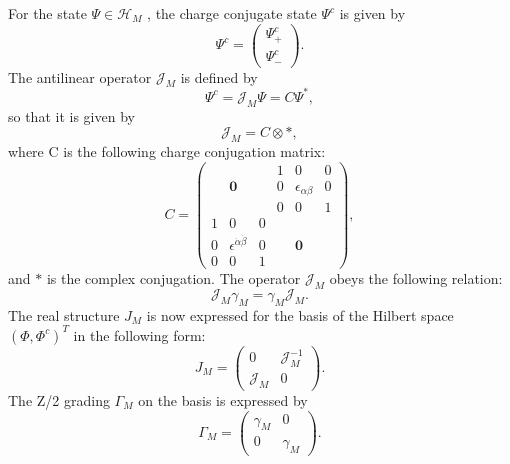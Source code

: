 \documentclass{ptephy}%
\begin{document}
For the state $\Psi \in \mathcal{H}_M$ , the charge conjugate state $\Psi^c$ is given by
\begin{equation}
\Psi^c = \begin{pmatrix}
\Psi_+^c\\
\Psi_-^c
\end{pmatrix}.
\end{equation}
The antilinear operator $\mathcal{J}_M$ is defined by
\begin{equation}
\Psi^c = \mathcal{J}_M\Psi =C\Psi^*,
\end{equation}
so that it is given by
\begin{equation}
\mathcal{J}_M = C\otimes *,
\end{equation}
where C is the following charge conjugation matrix:
\begin{equation}
C =\left(\begin{array}{ccc|ccc}
 & & & 1 & 0 & 0  \\
 & \mathbf{0} & & 0 & \epsilon_{\alpha\beta} & 0 \\
   & & & 0 & 0 & 1  \\
  \hline 
  1 & 0 & 0 & & &  \\
  0 & \epsilon^{\dot{\alpha}\dot{\beta}} & 0 & & \mathbf{0} & \\
  0 & 0 & 1 & & &
\end{array}\right),
\end{equation}
and $*$ is the complex conjugation. The operator $\mathcal{J}_M $ obeys the 
following relation:
\begin{equation} 
\mathcal{J}_M\gamma_M =\gamma_M\mathcal{J}_M.
\end{equation}
The real structure $J_M$ is now expressed for the basis 
of the Hilbert space $(\Phi,\Phi^c)^T$ in the following form:
\begin{equation}
J_M = \begin{pmatrix}
0 & \mathcal{J}_M^{-1}\\
\mathcal{J}_M & 0
\end{pmatrix}. 
\end{equation}
The Z/2 grading $\Gamma_M$ on the basis is expressed by
\begin{equation}
\Gamma_M = \begin{pmatrix}
\gamma_M & 0\\
0 & \gamma_M
\end{pmatrix}.
\end{equation}
\end{document}
